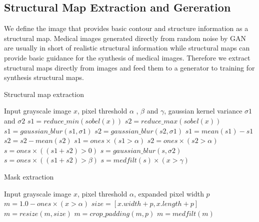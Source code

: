 \documentclass[runningheads]{llncs}
\begin{document}
	\subsection{Structural Map Extraction and Gereration}
	We define the image that provides basic contour and structure information as a structural map. Medical images generated directly from random noise by GAN are usually in short of realistic structural information while structural maps can provide basic guidance for the synthesis of medical images. Therefore we extract structural maps directly from images and feed them to a generator to training for synthesis structural maps.
	\vspace{-0.2cm}\begin{algorithm}[th]
		\caption{Structural map extraction}
		\label{alg:1}
		\begin{multicols}{2}
			\begin{algorithmic}[1]
				\State Input grayscale image $x$,
				pixel threshold $\alpha$ , $\beta$ and $\gamma$,
				gaussian kernel variance $\sigma 1$ and $\sigma 2$
				\State $s1 = reduce\_min(sobel(x))$
				\State $s2 = reduce\_max(sobel(x))$
				\State $s1 = gaussian\_blur(s1,\sigma 1)$
				\State $s2 = gaussian\_blur(s2,\sigma 1)$
				\State $s1 = mean(s1) - s1$
				\State $s2 = s2 - mean(s2)$
				\State $s1 = ones \times (s1 > \alpha)$
				\State $s2 = ones \times (s2 > \alpha)$
				\State $s = ones \times ((s1 + s2)> 0)$
				\State $s = gaussian\_blur(s,\sigma 2)$
				\State $s = ones \times ((s1 + s2)> \beta)$
				\State $s = medfilt(s)\times (x > \gamma)$
			\end{algorithmic} 
		\end{multicols}
		\vspace{-0.3cm}
	\end{algorithm}\vspace{-0.5cm}
	\vspace{-0.5cm}\begin{algorithm}[th]
		\caption{Mask extraction}
		\label{alg:2}
		\setstretch{0.8}
		\begin{multicols}{2}
			\begin{algorithmic}[1]
				\State Input grayscale image $x$, pixel threshold $\alpha$, expanded pixel width $p$
				\State $m = 1.0 - ones \times (x > \alpha)$
				\State $size=[x.width+p, x.length+p]$
				\State $m = resize(m, size)$
				\State $m = crop\_padding(m,p)$
				\State $m = medfilt(m)$
			\end{algorithmic} 
		\end{multicols}
		\vspace{-0.3cm}
	\end{algorithm}\vspace{-0.9cm}
\end{document}
